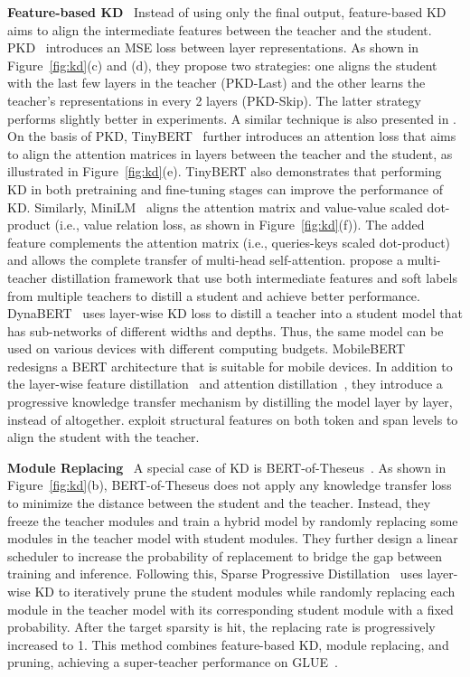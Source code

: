 \documentclass[letterpaper]{article}
\newcommand{\ie}{i.e.,\xspace}
\newcommand{\paratitle}[1]{\noindent\textbf{#1}\ }
\begin{document}
\paratitle{Feature-based KD}
Instead of using only the final output, feature-based KD aims to align the intermediate features between the teacher and the student. PKD~\citep{pkd} introduces an MSE loss between layer representations. As shown in Figure~\ref{fig:kd}(c) and (d), they propose two strategies: one aligns the student with the last few layers in the teacher (PKD-Last) and the other learns the teacher's representations in every 2 layers (PKD-Skip). The latter strategy performs slightly better in experiments. A similar technique is also presented in \citet{aguilar2020knowledge}.
On the basis of PKD, TinyBERT~\citep{tinybert} further introduces an attention loss that aims to align the attention matrices in layers between the teacher and the student, as illustrated in Figure~\ref{fig:kd}(e). TinyBERT also demonstrates that performing KD in both pretraining and fine-tuning stages can improve the performance of KD.
Similarly, MiniLM~\citep{minilm,minilmv2} aligns the attention matrix and value-value scaled dot-product (\ie value relation loss, as shown in Figure~\ref{fig:kd}(f)). The added feature complements the attention matrix (\ie queries-keys scaled dot-product) and allows the complete transfer of multi-head self-attention.
\citet{wu2021one} propose a multi-teacher distillation framework that use both intermediate features and soft labels from multiple teachers to distill a student and achieve better performance.
DynaBERT~\citep{dynabert} uses layer-wise KD loss to distill a teacher into a student model that has sub-networks of different widths and depths. Thus, the same model can be used on various devices with different computing budgets.
MobileBERT~\citep{mobilebert} redesigns a BERT architecture that is suitable for mobile devices. In addition to the layer-wise feature distillation~\citep{pkd} and attention distillation~\citep{tinybert}, they introduce a progressive knowledge transfer mechanism by distilling the model layer by layer, instead of altogether. \citet{liu2022multi} exploit structural features on both token and span levels to align the student with the teacher.

\paratitle{Module Replacing} A special case of KD is BERT-of-Theseus~\citep{bot}. As shown in Figure~\ref{fig:kd}(b), BERT-of-Theseus does not apply any knowledge transfer loss to minimize the distance between the student and the teacher. Instead, they freeze the teacher modules and train a hybrid model by randomly replacing some modules in the teacher model with student modules. They further design a linear scheduler to increase the probability of replacement to bridge the gap between training and inference. Following this, Sparse Progressive Distillation~\citep{huang2022sparse} uses layer-wise KD to iteratively prune the student modules while randomly replacing each module in the teacher model with its corresponding student module with a fixed probability. After the target sparsity is hit, the replacing rate is progressively increased to 1. This method combines feature-based KD, module replacing, and pruning, achieving a super-teacher performance on GLUE~\citep{glue}.
\end{document}
